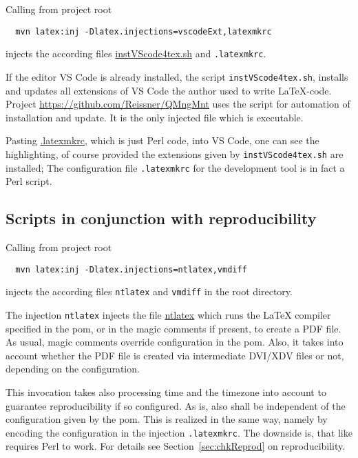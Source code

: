 Calling from project root 
%
\begin{Verbatim}
  mvn latex:inj -Dlatex.injections=vscodeExt,latexmkrc
\end{Verbatim}
%
injects the according files \href{\urlSite fromMain/instVScode4tex}{instVScode4tex.sh} and \texttt{.latexmkrc}. 

If the editor VS Code is already installed, 
the script \texttt{instVScode4tex.sh}, 
installs and updates all extensions of VS Code the author used to write \LaTeX-code. 
Project \url{https://github.com/Reissner/QMngMnt} 
uses the script for automation of installation and update. 
It is the only injected file which is executable. 

Pasting \href{\urlSite fromTex/.latexmkrc}{.latexmkrc}, 
which is just Perl code, 
into VS Code, one can see the highlighting, 
of course provided the extensions given by \texttt{instVScode4tex.sh} are installed; 
The configuration file \texttt{.latexmkrc} 
for the development tool  is in fact a Perl script. 


\subsection{Scripts in conjunction with reproducibility }\label{subsec:ntlatexVmdiff}

Calling from project root 
%
\begin{Verbatim}
  mvn latex:inj -Dlatex.injections=ntlatex,vmdiff
\end{Verbatim}
%
injects the according files \texttt{ntlatex} and \texttt{vmdiff} in the root directory. 

The injection \texttt{ntlatex} 
injects the file \href{\urlSite fromMain/ntlatex}{ntlatex} 
which runs the \LaTeX{} compiler specified in the pom, or in the magic comments if present, 
to create a PDF file. 
As usual, magic comments override configuration in the pom. 
Also, it takes into account whether the PDF file is created via intermediate DVI/XDV files or not, 
depending on the configuration. 

This invocation takes also processing time and the timezone into account 
to guarantee reproducibility if so configured. 
As  is, also  shall be independent 
of the configuration given by the pom. 
This is realized in the same way, 
namely by encoding the configuration in the injection \texttt{.latexmkrc}. 
The downside is, that  like  requires Perl to work. 
For details see Section~\ref{sec:chkReprod} on reproducibility. 

